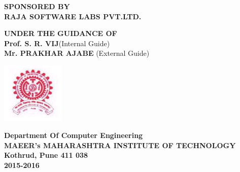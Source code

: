 \documentclass[12pt,a4paper]{report}
\begin{document}
		\begin{center}
			\textbf{SPONSORED BY}\\
			\vspace{0.05 in}
			\textbf{ RAJA SOFTWARE LABS PVT.LTD.}
		\end{center}
		\vspace{0.05 in}
		
	\begin{center}
	  \textbf{UNDER THE GUIDANCE OF}\\
	  \vspace{0.075 in}
	 \textbf{ Prof. S. R. VIJ}(Internal Guide)\\
	  \textbf{Mr. PRAKHAR AJABE }(External Guide)
	\end{center}
		
		\vspace{0.3 in}
\begin{center}
\includegraphics[width=3cm]{mitlogo}
\end{center}

		\begin{center}
	  \textbf{Department Of Computer Engineering}\\
\bf{MAEER’s MAHARASHTRA INSTITUTE OF TECHNOLOGY} \\
\textbf{Kothrud, Pune 411 038}\\
\textbf{2015-2016}
	\end{center}
\end{document}

